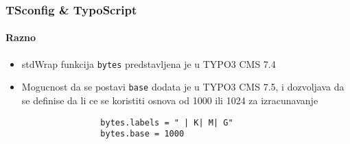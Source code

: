 \begin{frame}[fragile]
	\frametitle{TSconfig \& TypoScript}
	\framesubtitle{Razno}

	\begin{itemize}

		\item stdWrap funkcija \texttt{bytes}  predstavljena je u TYPO3 CMS 7.4

		\item Mogucnost da se postavi \texttt{base} dodata je u TYPO3 CMS 7.5, 
			i dozvoljava da se definise da li ce se koristiti osnova od 1000 ili 1024 za izracunavanje

			\begin{lstlisting}
				bytes.labels = " | K| M| G"
				bytes.base = 1000
			\end{lstlisting}

	\end{itemize}

\end{frame}

